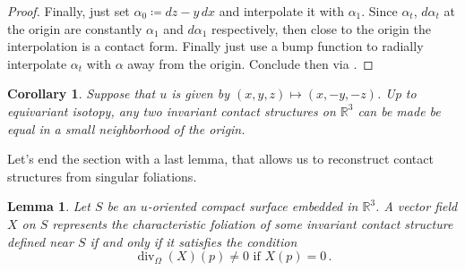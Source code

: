 \documentclass[a4paper, 11pt]{amsart}
\theoremstyle{plain}
\newtheorem{cor}[cor]{Corollary}
\newtheorem{lemma}[lemma]{Lemma}
\theoremstyle{definition}
\newcommand{\R}{\mathbb{R}}
\DeclareMathOperator{\diver}{div}
\begin{document}
\begin{proof}
	
	Finally, just set $\alpha_0 \coloneqq dz - y\,dx$ and interpolate it with $\alpha_1$. Since $\alpha_t$, $d\alpha_t$ at the origin are constantly $\alpha_1$ and $d\alpha_1$ respectively, then close to the origin the interpolation is a contact form. Finally just use a bump function to radially interpolate $\alpha_t$ with $\alpha$ away from the origin. Conclude then via .
\end{proof}
\begin{cor}\label{equalneighorigin}
	Suppose that $u$ is given by $(x,y,z) \mapsto (x,-y,-z)$. Up to equivariant isotopy, any two invariant contact structures on $\R^3$ can be made be equal in a small neighborhood of the origin.
\end{cor}

Let's end the section with a last lemma, that allows us to reconstruct contact structures from singular foliations.
\begin{lemma}\label{charinducescontact}
	Let $S$ be an $u$-oriented compact surface embedded in $\R^3$. A vector field $X$ on $S$ represents the characteristic foliation of some invariant contact structure defined near $S$ if and only if it satisfies the condition
	\[
		\diver_\Omega(X)(p)\neq 0 \text{ if } X(p)=0\,.
	\]
\end{lemma}
\end{document}
